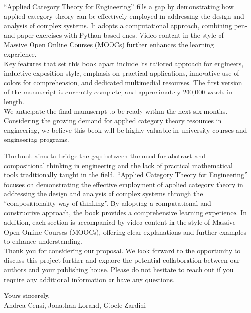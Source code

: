 \documentclass[10pt, article, one side]{memoir}
\begin{document}
    ``Applied Category Theory for Engineering'' fills a gap by demonstrating how applied category theory can be effectively employed in addressing the design and analysis of complex systems.
    It adopts a computational approach, combining pen-and-paper exercises with Python-based ones.
    Video content in the style of Massive Open Online Courses (MOOCs) further enhances the learning experience.
    \\[-7pt]

    Key features that set this book apart include its tailored approach for engineers, inductive exposition style, emphasis on practical applications, innovative use of colors for comprehension, and dedicated multimedial resourses.
    The first version of the manuscript is currently complete, and approximately 200,000 words in length.
    \\[-7pt]

    We anticipate the final manuscript to be ready within the next six months.
    Considering the growing demand for applied category theory resources in engineering, we believe this book will be highly valuable in university courses and engineering programs.

    The book aims to bridge the gap between the need for abstract and compositional thinking in engineering and the lack of practical mathematical tools traditionally taught in the field.
    ``Applied Category Theory for Engineering'' focuses on demonstrating the effective employment of applied category theory in addressing the design and analysis of complex systems through the ``compositionality way of thinking''.
    By adopting a computational and constructive approach, the book provides a comprehensive learning experience.
    In addition, each section is accompanied by video content in the style of Massive Open Online Courses (MOOCs), offering clear explanations and further examples to enhance understanding.
    \\[-7pt]

    Thank you for considering our proposal.
    We look forward to the opportunity to discuss this project further and explore the potential collaboration between our authors and your publishing house.
    Please do not hesitate to reach out if you require any additional information or have any questions.

    \noindent Yours sincerely,\\

    \noindent \hspace{8cm}
    Andrea Censi, Jonathan Lorand, Gioele Zardini
\end{document}
